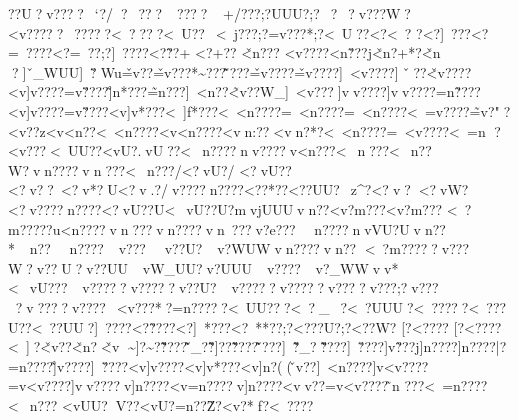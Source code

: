{{{{{{{{{{{{{{{{{{{{{{{{{{{{{{{{{{{{{{{{{{{{{{{{{{{{{{{{{{{{{{{{{{{{{{{{{{{{{{{{{{{{{{{{{{{{{{{{{{{{{{{{{{{{{{{{{{{{{{{{{{{{{{{{{{{{{{{{{{{{{{{{{{{{{{{{{{{{{{{{{{{{{{{{{{{{{{{{{{{{{{{{{{{{{{{{{{{{{{{{{{{{{{{{{{{{{{{{{{{{{{{{{{{{{{{{{{{{{{{{{{{{{{{{{{{{{{{{{{{{{{{{{{{{{{{{{{{{{{{{{{{{{{{{{{{{{{{{{{{{{{{{{{{{{{{{{{{{{{{{{{{{{{{{{{{{{{{{{{{{{{{{{{{{{{{{{{{{{{{{{{{{{{{{{{{{{{{{{{{{{{{{{{{{{{{{{{{{{{{{{{{{{{{{{{{{{{{{{{{{{{{{{{{{{{{{{{{{{{{{{{{{{{{{{{{{{{{{{{{{{{{{{{{{{{{{{{{{{{{{{{{{{{{{{{{{{{{{{{{{{{{{{{{{{{{{{{{{{{{{{{{{{{{{{{{{{{{{{{{{{{{{{{{{{{{{{{{{{{{{{{{{{{{{{{{{{{{{{{{{{{{{{{{{{{{{{{{{{{{{{{{{{{{{{{{{{{{{{{{{{{{{{{{{{{{{{{{{{{{{{{{{{{{{{{{{{{{{{{{{{{{{{{{{{{{{{{{{{{{{{{{{{{{{{{{{{{{{{{{{{{{{{{{{{{{{{{{{{{{{{{{{{{{{{{{{{{{{{{{{{{{{{{{{{{{{{{{{{{{{{{{{{{{{{{{{{{{{{{{{{{{{{{{{{{{{{{{{{{{{{{{{{{{{{??U?v ????~`?/?~??  ?~????~
+/???;?UUU?;?~  ?~?v???W?<v?????~?????<~????<~}U??~<~j???;?=v???*;?<~U??<?<~?
 ?<?]~ ???<?=~????<?=~? ? ;?]~????<?\~??+ <?\?+??
\v<n???
<v\n????<n\v???j\v<n?+*?\v<n
?]~\v_WUU]~\v?Wu\v=v?  ?\v=v???*\~\vW???\~\v???\v=v????\v=v????]~<v????]~\v??\v<v????<v]v????=v\v????\~]n*???\~=n???]~<n??\~<v??W_]~<v???]vv????]vv????=n\~????<v]v????=v\v????<v]v*???<~]f*???<~<n????=~<n????=~<n????<~=v????\~=v?"?\?<v??z<v<n ??<~<n????<v<n????<vn:??<vn?*? <~<n????=~<v????<~=n
?
\?<v???\?<~UU??\?<vU?.\?vU??<~n????nv????v<n???<~n???<~n??W?vn????vn???<~n???/<?vU?/
<?vU? ?<?v??~<?v*?U<?v.?/\?v????\?n????<?\??*??\?<??UU?\?~z^? <?v?<?vW? <?v????\?n????<?vU??U<~vU??U?mvjUUUvn? ? <v?m??? <v?m???
<~?m?????u<n????vn???vn????vn~???v?e???~n????nvVU?Uvn??* ~n?? ~n????~v???~v??U?~v?WUWvn????vn??
<~?m?????v???W?v??U?v??UU~vW_UU?}v?UUU~v????~v?_WWvv*   <~vU???~v?????v?????v??U?~v?????v?????v ????v ???;?v????v????v????~<v???*?=n?????<~UU???<~?_~?<~?UUU?<~?????<~???U??<~??UU?]~????<?\~????<?]~*???<?}~**??;?<???U?;?<??W?
[?<????
[?<???? <~\vU]?\v<v?? \v<n?  \v<v   \~\vUU]?\~\vUuw?\~\v????\~\v_??\~\v}]??\~\v????\~\v???]~\vuUW}\~\v?_?\~\v????]~\v????]v\~???j\?]n????\?]n????|?=n????\~]v????]~\v????<v]v????<v]v*???<v]n?((\vv??]~<n????]v<v????=v<v????]vv????v]n????<v=n????v]n????<vv??=v<v????\~n
???<~=n????<~n???
\?<vUU?\?V??  \?<vU?  \?=n??  \?\~Z?  \?<v?*  \?f?   \?<~????\?}}}}}}}}}}}}}}}}}}}}}}}}}}}}}}}}}}}}}}}}}}}}}}}}}}}}}}}}}}}}}}}}}}}}}}}}}}}}}}}}}}}}}}}}}}}}}}}}}}}}}}}}}}}}}}}}}}}}}}}}}}}}}}}}}}}}}}}}}}}}}}}}}}}}}}}}}}}}}}}}}}}}}}}}}}}}}}}}}}}}}}}}}}}}}}}}}}}}}}}}}}}}}}}}}}}}}}}}}}}}}}}}}}}}}}}}}}}}}}}}}}}}}}}}}}}}}}}}}}}}}}}}}}}}}}}}}}}}}}}}}}}}}}}}}}}}}}}}}}}}}}}}}}}}}}}}}}}}}}}}}}}}}}}}}}}}}}}}}}}}}}}}}}}}}}}}}}}}}}}}}}}}}}}}}}}}}}}}}}}}}}}}}}}}}}}}}}}}}}}}}}}}}}}}}}}}}}}}}}}}}}}}}}}}}}}}}}}}}}}}}}}}}}}}}}}}}}}}}}}}}}}}}}}}}}}}}}}}}}}}}}}}}}}}}}}}}}}}}}}}}}}}}}}}}}}}}}}}}}}}}}}}}}}}}}}}}}}}}}}}}}}}}}}}}}}}}}}}}}}}}}}}}}}}}}}}}}}}}}}}}}}}}}}}}}}}}}}}}}}}}}}}}}}}}}}}}}}}}}}}}}}}}}}}}}}}}}}}}}}}}}}}}}}}}}}}}}}}}}}}}}}}}}}}}}}}}}}}}}}}}}}}}}}}}}}}}}}}}}}}}}}}}}}}}}}}}}}}}}}}}}}}}}}}}}}}}}}}}}}}}}}}}}}}}}}}}}}}}}}}}}}}}}}}}}}}}}}}}}}}}}}}}}}}}}}}}}}}}}}}}}}}
